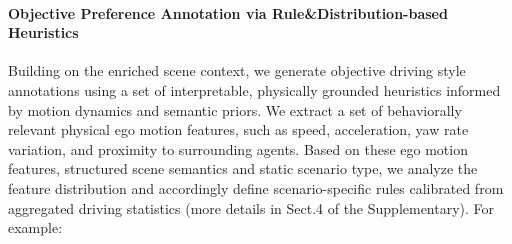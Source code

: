 \documentclass{article}
\begin{document}
\paragraph{Objective Preference Annotation via Rule\&Distribution-based Heuristics}
Building on the enriched scene context, we generate objective driving style annotations using a set of interpretable, physically grounded heuristics informed by motion dynamics and semantic priors. We extract a set of behaviorally relevant physical ego motion features, such as speed, acceleration, yaw rate variation, and proximity to surrounding agents. Based on these ego motion features, structured scene semantics and static scenario type, we analyze the feature distribution and accordingly define scenario-specific rules calibrated from aggregated driving statistics (more details in Sect.4 of the Supplementary). For example:
\end{document}
